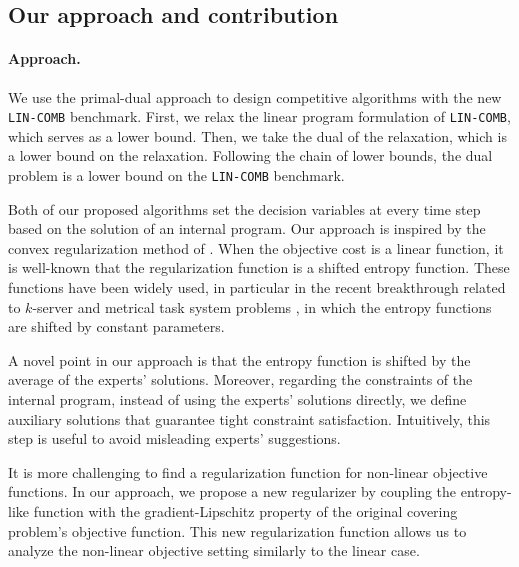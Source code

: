 \subsection{Our approach and contribution}

\paragraph{Approach.} We use the primal-dual approach to design competitive algorithms with the new \texttt{LIN-COMB} benchmark. First, we relax the linear program formulation of \texttt{LIN-COMB}, which serves as a lower bound. Then, we take the dual of the relaxation, which is a lower bound on the relaxation. Following the chain of lower bounds, the dual problem is a lower bound on the \texttt{LIN-COMB} benchmark.

Both of our proposed algorithms set the decision variables at every time step based on the solution of an internal program. Our approach is inspired by the
convex regularization method of \cite{BuchbinderChen14:Competitive-Analysis}.
When the objective cost is a linear function, it is well-known that the regularization function is a shifted entropy function.
These functions have been widely used, in particular in the recent breakthrough related to $k$-server \cite{BubeckCohen18:K-server-via-multiscale,BuchbinderGupta19:k-servers-with}
and metrical task system problems \cite{BubeckCohen21:Metrical-task},
in which the entropy functions are shifted by constant parameters.

A novel point in our approach is that the entropy function is shifted by the average of the experts' solutions.
Moreover, regarding the constraints of the internal program, instead of using the experts' solutions directly,
we define auxiliary solutions that guarantee tight constraint satisfaction.
Intuitively, this step is useful to avoid misleading experts' suggestions.

It is more challenging to find a regularization function for non-linear objective functions.
In our approach, we propose a new regularizer by coupling the entropy-like function with the gradient-Lipschitz property of the original covering problem's objective function.
This new regularization function allows us to analyze the non-linear objective setting similarly to the linear case.

